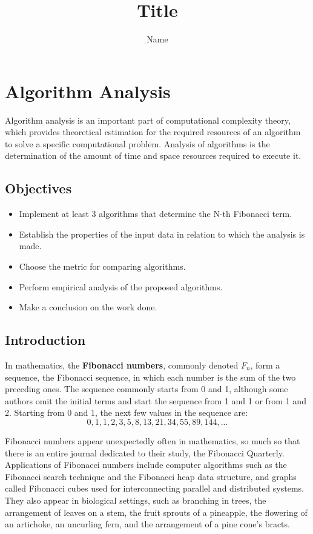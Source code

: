 \documentclass[a4paper, 12pt]{article}
\author{Name}
\title{Title}
\begin{document}
\pgfplotsset{compat=1.17}

\tableofcontents

\newpage

\section{Algorithm Analysis}

\par Algorithm analysis is an important part of computational complexity theory, which provides theoretical estimation for the required resources of an algorithm to solve a specific computational problem. Analysis of algorithms is the determination of the amount of time and space resources required to execute it.

\subsection{Objectives}

\begin{itemize}
  \item Implement at least 3 algorithms that determine the N-th Fibonacci term.
  \item Establish the properties of the input data in relation to which the analysis is made.
  \item Choose the metric for comparing algorithms.
  \item Perform empirical analysis of the proposed algorithms.
  \item Make a conclusion on the work done.
\end{itemize}

\subsection{Introduction}

In mathematics, the \textbf{Fibonacci numbers}, commonly denoted $F_n$, 
form a sequence, the Fibonacci sequence, in which each number 
is the sum of the two preceding ones. The sequence commonly 
starts from 0 and 1, although some authors omit the initial 
terms and start the sequence from 1 and 1 or from 1 and 2. 
Starting from 0 and 1, the next few values in the sequence are:
$$0, 1, 1, 2, 3, 5, 8, 13, 21, 34, 55, 89, 144, ...$$

\par Fibonacci numbers appear unexpectedly often in mathematics, so much 
so that there is an entire journal dedicated to their study, the 
Fibonacci Quarterly. Applications of Fibonacci numbers include computer 
algorithms such as the Fibonacci search technique and the Fibonacci heap 
data structure, and graphs called Fibonacci cubes used for interconnecting 
parallel and distributed systems. They also appear in biological settings, 
such as branching in trees, the arrangement of leaves on a stem, the fruit 
sprouts of a pineapple, the flowering of an artichoke, an uncurling fern, 
and the arrangement of a pine cone's bracts. \par
\end{document}
